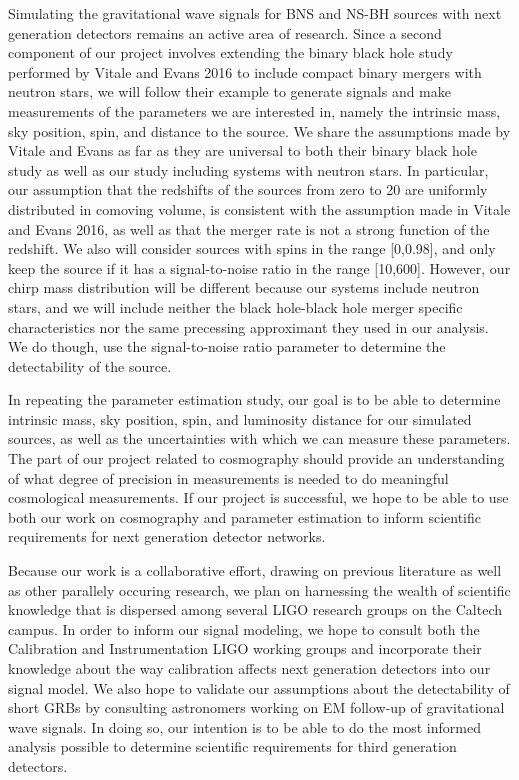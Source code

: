 \documentclass{article}
\begin{document}
Simulating the gravitational wave signals for BNS and NS-BH sources with next generation detectors remains an active area of research.  Since a second component of our project involves extending the binary black hole study performed by Vitale and Evans 2016 to include compact binary mergers with neutron stars, we will follow their example to generate signals and make measurements of the parameters we are interested in, namely the intrinsic mass, sky position, spin, and distance to the source.  We share the assumptions made by Vitale and Evans as far as they are universal to both their binary black hole study as well as our study including systems with neutron stars.  In particular, our assumption that the redshifts of the sources from zero to 20 are uniformly distributed in comoving volume, is consistent with the assumption made in Vitale and Evans 2016, as well as that the merger rate is not a strong function of the redshift.  We also will consider sources with spins in the range [0,0.98], and only keep the source if it has a signal-to-noise ratio in the range [10,600].  However, our chirp mass distribution will be different because our systems include neutron stars, and we will include neither the black hole-black hole merger specific characteristics nor the same precessing approximant they used in our analysis.  We do though, use the signal-to-noise ratio parameter to determine the detectability of the source.

In repeating the parameter estimation study, our goal is to be able to determine intrinsic mass, sky position, spin, and luminosity distance for our simulated sources, as well as the uncertainties with which we can measure these parameters.  The part of our project related to cosmography should provide an understanding of what degree of precision in measurements is needed to do meaningful cosmological measurements.  If our project is successful, we hope to be able to use both our work on cosmography and parameter estimation to inform scientific requirements for next generation detector networks.

Because our work is a collaborative effort, drawing on previous literature as well as other parallely occuring research, we plan on harnessing the wealth of scientific knowledge that is dispersed among several LIGO research groups on the Caltech campus.  In order to inform our signal modeling, we hope to consult both the Calibration and Instrumentation LIGO working  groups and incorporate their knowledge about the way calibration affects next generation detectors into our signal model.  We also hope to validate our assumptions about the detectability of short GRBs by consulting astronomers working on EM follow-up of gravitational wave signals.  In doing so, our intention is to be able to do the most informed analysis possible to determine scientific requirements for third generation detectors.
\end{document}
